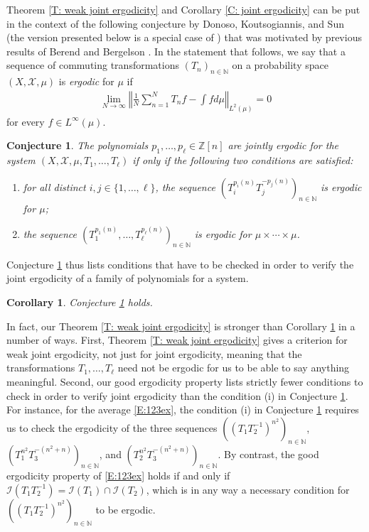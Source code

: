 \documentclass[11pt]{amsart}
\newtheorem{corollary}[lemma]{Corollary}
\newtheorem{conjecture}{Conjecture}
\theoremstyle{definition}
\newcommand{\N}{{\mathbb N}}
\newcommand{\Z}{{\mathbb Z}}
\newcommand{\CI}{{\mathcal I}}
\newcommand{\CX}{{\mathcal X}}
\newcommand{\norm}[1]{\left\Vert #1\right\Vert}
\newcommand{\inv}{^{-1}}
\begin{document}
Theorem \ref{T: weak joint ergodicity} and Corollary \ref{C: joint ergodicity}
 can be put in the context of the following conjecture by Donoso, Koutsogiannis, and Sun (the version presented below is a special case of {\cite[Conjecture 1.5]{DKS19}}) that was motivated by previous results of  Berend and Bergelson \cite{BB84}.
In the statement that follows, we  say that a sequence of commuting transformations $(T_n)_{n\in\N}$ on a probability space $(X, \CX, \mu)$ is \emph{ergodic} for $\mu$ if
 \begin{align*}
 	\lim_{N\to\infty}\norm{\frac{1}{N}\sum_{n=1}^N T_n f - \int f d\mu}_{L^2(\mu)}=0
 \end{align*}
 for every $f\in L^\infty(\mu)$.
\begin{conjecture}\label{C:DKS conjecture}
The polynomials $p_1, \ldots, p_\ell\in \Z[n]$ are jointly ergodic for the system $(X,\CX, \mu,T_1, \ldots, T_\ell)$ if only if the following two conditions are satisfied:
\begin{enumerate}
    \item for all distinct $i, j\in\{1, \ldots, \ell\}$, the sequence $(T_i^{p_i(n)} T_j^{-p_j(n)})_{n\in\N}$ is ergodic for $\mu$;
    \item the sequence $(T_1^{p_1(n)}, \ldots, T_\ell^{p_\ell(n)})_{n\in\N}$ is ergodic for $\mu\times \cdots \times \mu$.
\end{enumerate}
\end{conjecture}
Conjecture \ref{C:DKS conjecture} thus lists conditions that have to be checked in order to verify the joint ergodicity of a family of polynomials for a system.

\begin{corollary}\label{C:DKS conjecture holds}
    Conjecture \ref{C:DKS conjecture} holds.
\end{corollary}
In fact, our Theorem \ref{T: weak joint ergodicity} is stronger than Corollary \ref{C:DKS conjecture holds} in a number of ways. First, Theorem \ref{T: weak joint ergodicity} gives a criterion for weak joint ergodicity, not just for joint ergodicity, meaning that the transformations $T_1, \ldots, T_\ell$ need not be ergodic for us to be able to say anything meaningful. Second, our good ergodicity property lists strictly fewer conditions to check in order to verify joint ergodicity than the condition (i) in Conjecture \ref{C:DKS conjecture}. For instance, for the average \eqref{E:123ex}, the condition (i) in Conjecture \ref{C:DKS conjecture} requires us to check the ergodicity of the three sequences $((T_1 T_2\inv)^{n^2})_{n\in\N}$, $(T_1^{n^2} T_3^{-(n^2+n)})_{n\in\N}$, and $(T_2^{n^2}T_3^{-(n^2+n)})_{n\in\N}$. %
By contrast, the good ergodicity property of \eqref{E:123ex} holds if and only if $\CI(T_1 T_2^{-1}) = \CI(T_1)\cap\CI(T_2)$, which is in any way a necessary condition for $((T_1 T_2\inv)^{n^2})_{n\in\N}$ to be ergodic.
\end{document}
